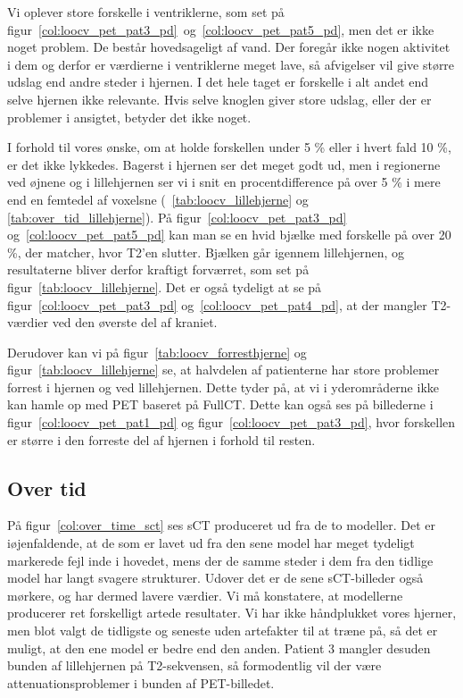 Vi oplever store forskelle i ventriklerne, som set på figur~\ref{col:loocv_pet_pat3_pd}~og~\ref{col:loocv_pet_pat5_pd},  men det er ikke noget problem. De består hovedsageligt af vand. Der foregår ikke nogen aktivitet i dem og derfor er værdierne i ventriklerne meget lave, så afvigelser vil give større udslag end andre steder i hjernen. I det hele taget er forskelle i alt andet end selve hjernen ikke relevante. Hvis selve knoglen giver store udslag, eller der er problemer i ansigtet, betyder det ikke noget.


I forhold til vores ønske, om at holde forskellen under 5 \% eller i hvert fald 10 \%,  er det ikke lykkedes. Bagerst i hjernen ser det meget godt ud, men i regionerne ved øjnene og i lillehjernen ser vi i snit en procentdifference på over 5 \% i mere end en femtedel af voxelsne (~\ref{tab:loocv_lillehjerne} og \ref{tab:over_tid_lillehjerne}). På figur~\ref{col:loocv_pet_pat3_pd} og~\ref{col:loocv_pet_pat5_pd}  kan man se en hvid bjælke med forskelle på over 20 \%, der matcher, hvor T2’en slutter. Bjælken går igennem lillehjernen, og resultaterne bliver derfor kraftigt forværret, som set på figur~\ref{tab:loocv_lillehjerne}. Det er også tydeligt at se på figur~\ref{col:loocv_pet_pat3_pd} og~\ref{col:loocv_pet_pat4_pd}, at der mangler T2-værdier ved den øverste del af kraniet.


Derudover kan vi på figur~\ref{tab:loocv_forresthjerne} og figur~\ref{tab:loocv_lillehjerne} se, at halvdelen af patienterne har store problemer forrest i hjernen og ved lillehjernen. Dette tyder på, at vi i yderområderne ikke kan hamle op med PET baseret på FullCT. Dette kan også ses på billederne i figur~\ref{col:loocv_pet_pat1_pd} og figur~\ref{col:loocv_pet_pat3_pd}, hvor forskellen er større i den forreste del af hjernen i forhold til resten.

\subsection{Over tid}

På figur~\ref{col:over_time_sct} ses sCT produceret ud fra
de to modeller. Det er iøjenfaldende, at de som er lavet ud fra den sene model
har meget tydeligt markerede fejl inde i hovedet, mens der de samme
steder i dem fra den tidlige model har langt svagere strukturer. Udover
det er de sene sCT-billeder også mørkere, og har dermed lavere værdier. Vi må
konstatere, at modellerne producerer ret forskelligt artede resultater.
Vi har ikke håndplukket vores hjerner, men blot valgt de tidligste
og seneste uden artefakter til at træne på, så det er muligt, at
den ene model er bedre end den anden. Patient 3 mangler desuden
bunden af lillehjernen på T2-sekvensen, så formodentlig vil der være
attenuationsproblemer i bunden af PET-billedet.

